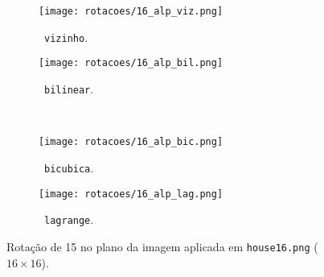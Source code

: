 \begin{figure}[H]
    \centering\hfill
    \begin{subfigure}{0.4\textwidth}
        \centering
        \texttt{[image: rotacoes/16\_alp\_viz.png]}
        \caption{~\texttt{vizinho}.}
    \end{subfigure}%
    \hfill%
    \begin{subfigure}{0.4\textwidth}
        \centering
        \texttt{[image: rotacoes/16\_alp\_bil.png]}
        \caption{~\texttt{bilinear}.}
    \end{subfigure}\hfill
    \\[8pt]\hfill
    \begin{subfigure}{0.4\textwidth}
        \centering
        \texttt{[image: rotacoes/16\_alp\_bic.png]}
        \caption{~\texttt{bicubica}.}
    \end{subfigure}%
    \hfill%
    \begin{subfigure}{0.4\textwidth}
        \centering
        \texttt{[image: rotacoes/16\_alp\_lag.png]}
        \caption{~\texttt{lagrange}.}
    \end{subfigure}\hfill

    \caption{Rotação de 15\textdegree{} no plano da imagem aplicada em \texttt{house16.png} ($16 \times 16$).}
    \label{fig:house16:alp}
\end{figure}